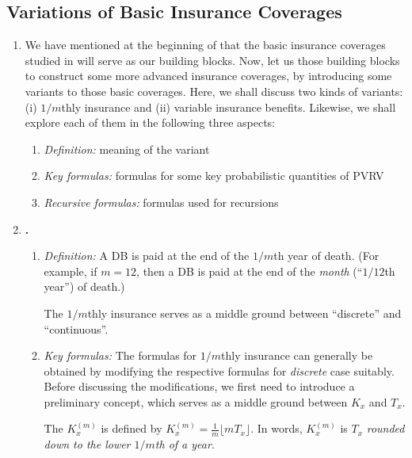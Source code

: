 \subsection{Variations of Basic Insurance Coverages}
\label{subsect:variations-insurance}
\begin{enumerate}
\item We have mentioned at the beginning of  that
the basic insurance coverages studied in  will
serve as our building blocks. Now, let us those building blocks to construct
some more advanced insurance coverages, by introducing some variants to those
basic coverages. Here, we shall discuss two kinds of variants: (i) \(1/m\)thly
insurance and (ii) variable insurance benefits. Likewise, we shall explore each
of them in the following three aspects:
\begin{enumerate}[label={(\arabic*)}]
\item \emph{Definition:} meaning of the variant
\item \emph{Key formulas:} formulas for some key probabilistic quantities of PVRV
\item \emph{Recursive formulas:} formulas used for recursions
\end{enumerate}

\item \textbf{.}
\begin{enumerate}[label={(\arabic*)}]
\item \emph{Definition:} A DB is paid at the end of the \(1/m\)th year of
death.  (For example, if \(m=12\), then a DB is paid at the end of the
\emph{month} (``\(1/12\)th year'') of death.)

The \(1/m\)thly insurance serves as a middle ground between ``discrete'' and
``continuous''.

\item \emph{Key formulas:} The formulas for \(1/m\)thly insurance can generally
be obtained by modifying the respective formulas for \emph{discrete} case
suitably. Before discussing the modifications, we first need to introduce a
preliminary concept, which serves as a middle ground between \(K_x\) and \(T_x\).

The  \(K_x^{(m)}\)
is defined by \(K_x^{(m)}=\frac{1}{m}\lfloor mT_x\rfloor\). In words,
\(K_x^{(m)}\) is \(T_x\) \emph{rounded down to the lower \(1/m\)th of a year}.


\end{enumerate}
\end{enumerate}

